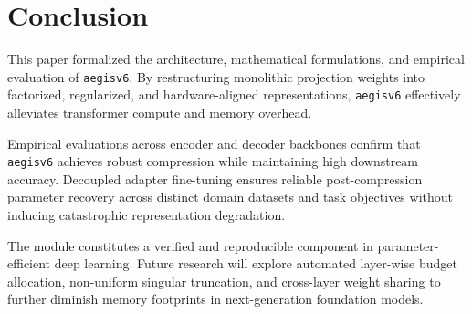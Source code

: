 \section{Conclusion}
This paper formalized the architecture, mathematical formulations, and empirical evaluation of \texttt{aegisv6}. By restructuring monolithic projection weights into factorized, regularized, and hardware-aligned representations, \texttt{aegisv6} effectively alleviates transformer compute and memory overhead.

Empirical evaluations across encoder and decoder backbones confirm that \texttt{aegisv6} achieves robust compression while maintaining high downstream accuracy. Decoupled adapter fine-tuning ensures reliable post-compression parameter recovery across distinct domain datasets and task objectives without inducing catastrophic representation degradation.

The module constitutes a verified and reproducible component in parameter-efficient deep learning. Future research will explore automated layer-wise budget allocation, non-uniform singular truncation, and cross-layer weight sharing to further diminish memory footprints in next-generation foundation models.
